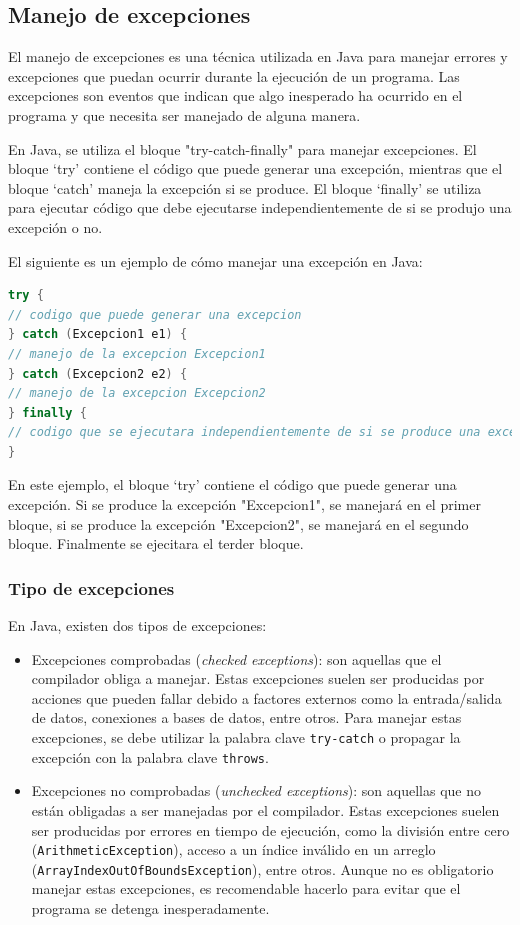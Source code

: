 \documentclass[executivepaper]{article}
\begin{document}
\subsection{Manejo de excepciones}

El manejo de excepciones es una técnica utilizada en Java para manejar errores y excepciones que puedan ocurrir durante la ejecución de un programa. Las excepciones son eventos que indican que algo inesperado ha ocurrido en el programa y que necesita ser manejado de alguna manera.

En Java, se utiliza el bloque "try-catch-finally" para manejar excepciones. El bloque \enquote*{try} contiene el código que puede generar una excepción, mientras que el bloque \enquote*{catch} maneja la excepción si se produce. El bloque \enquote*{finally} se utiliza para ejecutar código que debe ejecutarse independientemente de si se produjo una excepción o no.

El siguiente es un ejemplo de cómo manejar una excepción en Java:

\begin{lstlisting}[language=Java]
try {
// codigo que puede generar una excepcion
} catch (Excepcion1 e1) {
// manejo de la excepcion Excepcion1
} catch (Excepcion2 e2) {
// manejo de la excepcion Excepcion2
} finally {
// codigo que se ejecutara independientemente de si se produce una excepcion o no
}
\end{lstlisting}
En este ejemplo, el bloque \enquote*{try} contiene el código que puede generar una excepción. Si se produce la excepción "Excepcion1", se manejará en el primer bloque, si se produce la excepción "Excepcion2", se manejará en el segundo bloque. Finalmente se ejecitara el terder bloque.

\subsubsection{Tipo de excepciones}

En Java, existen dos tipos de excepciones:

\begin{itemize}
\item Excepciones comprobadas (\textit{checked exceptions}): son aquellas que el compilador obliga a manejar. Estas excepciones suelen ser producidas por acciones que pueden fallar debido a factores externos como la entrada/salida de datos, conexiones a bases de datos, entre otros. Para manejar estas excepciones, se debe utilizar la palabra clave \texttt{try-catch} o propagar la excepción con la palabra clave \texttt{throws}.

\item Excepciones no comprobadas (\textit{unchecked exceptions}): son aquellas que no están obligadas a ser manejadas por el compilador. Estas excepciones suelen ser producidas por errores en tiempo de ejecución, como la división entre cero (\texttt{ArithmeticException}), acceso a un índice inválido en un arreglo (\texttt{ArrayIndexOutOfBoundsException}), entre otros. Aunque no es obligatorio manejar estas excepciones, es recomendable hacerlo para evitar que el programa se detenga inesperadamente.
\end{itemize}
\end{document}
